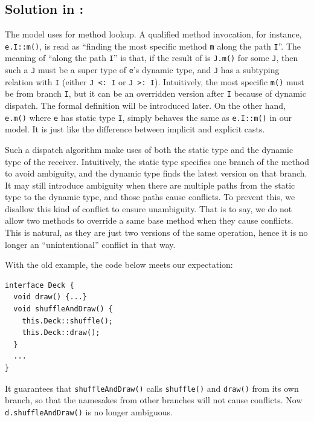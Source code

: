 \subsection{Solution in \MIM: \dispatchnamecaptical}\label{subsec:solutionmim}
The \MIM{} model uses \dispatchnameit{} for method lookup. A qualified
method invocation, for instance, \lstinline|e.I::m()|, is read as
``finding the most specific method \lstinline|m| along the path
\lstinline|I|''. The meaning of ``along the path \lstinline|I|'' is
that, if the result of \dispatch{} is \lstinline|J.m()| for some \lstinline|J|, then such a \lstinline|J| must be a super type of \lstinline|e|'s dynamic type, and \lstinline|J| has a subtyping relation with \lstinline|I| (either \lstinline|J <: I| or \lstinline|J >: I|). Intuitively, the most specific \lstinline|m()| must be from branch \lstinline|I|, but it can be an overridden version after \lstinline|I| because of dynamic dispatch. The formal definition will be introduced later. On the other hand, \lstinline|e.m()| where \lstinline|e| has static type \lstinline|I|, simply behaves the same as \lstinline|e.I::m()| in our model. It is just like the difference between implicit and explicit casts.

Such a dispatch algorithm make uses of both the static type and the dynamic type of the receiver. Intuitively, the static type specifies one branch of the method to avoid ambiguity, and the dynamic type finds the latest version on that branch. It may still introduce ambiguity when there are multiple paths from the static type to the dynamic type, and those paths cause conflicts. To prevent this, we disallow this kind of conflict to ensure unambiguity. That is to say, we do not allow two methods to override a same base method when they cause conflicts. This is natural, as they are just two versions of the same operation, hence it is no longer an ``unintentional'' conflict in that way.

With the old example, the code below meets our expectation:
\vspace{3pt}\begin{lstlisting}
interface Deck {
  void draw() {...}
  void shuffleAndDraw() {
    this.Deck::shuffle();
    this.Deck::draw();
  }
  ...
}
\end{lstlisting}\vspace{3pt}
It guarantees that \lstinline|shuffleAndDraw()| calls \lstinline|shuffle()| and \lstinline|draw()| from its own branch, so that the namesakes
from other branches will not cause conflicts. Now \lstinline|d.shuffleAndDraw()| is no longer ambiguous.

